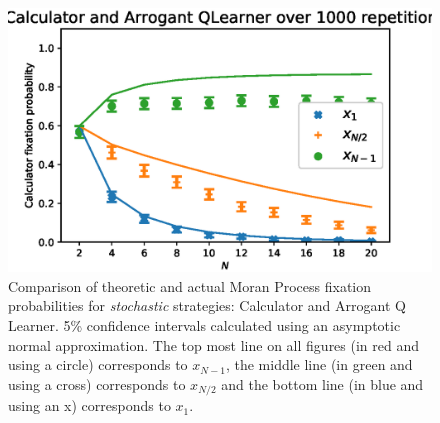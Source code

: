 \documentclass[10pt,letterpaper]{article}
\begin{document}
\begin{figure}[!hbtp]
    \centering
    \includegraphics[draft, width=.95\columnwidth]{./Fig2.eps}
    \caption{Comparison of theoretic and actual Moran Process
             fixation probabilities for \textit{stochastic} strategies:
             Calculator and Arrogant Q Learner. 5\% confidence intervals calculated using an asymptotic
     normal approximation.
The top most line on all figures (in red and using a circle) corresponds to
\(x_{N-1}\), the middle line (in green and using a cross) corresponds to
\(x_{N/2}\) and the bottom line (in blue and using an x) corresponds to
\(x_{1}\).}
    \label{fig:comparison_stochastic}
\end{figure}
\end{document}
